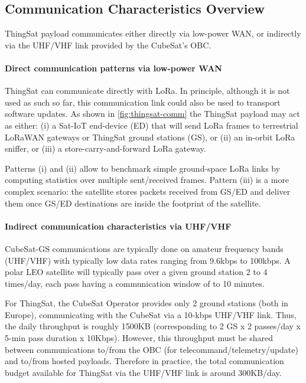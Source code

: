 \subsection{Communication Characteristics Overview}
\label{sec:thingsat-comm-characteristics}

ThingSat payload communicates either directly via low-power WAN, or indirectly
via the UHF/VHF link provided by the CubeSat's OBC.

\paragraph*{Direct communication patterns via low-power WAN}
ThingSat can communicate directly with LoRa. In principle, although it is not used as
such so far, this communication link could also be used to transport software updates.
As shown in \autoref{fig:thingsat-comm} the ThingSat payload may act as either:
(i) a Sat-IoT end-device (ED) that will send LoRa frames to terrestrial LoRaWAN gateways or ThingSat ground stations (GS), or
(ii) an in-orbit LoRa sniffer, or
(iii) a store-carry-and-forward LoRa gateway.

Patterns (i) and (ii) allow to benchmark simple ground-space LoRa links by
computing statistics over multiple sent/received frames.
Pattern (iii) is a more
complex scenario: the satellite stores packets received from GS/ED and deliver
them once GS/ED destinations are inside the footprint of the satellite.

\paragraph*{Indirect communication characteristics via UHF/VHF}
CubeSat-GS communications are typically done on amateur frequency
bands (UHF/VHF) with typically low data rates ranging from 9.6kbps to
100kbps.
A polar LEO satellite will typically pass over a given ground station 2 to 4 times/day,
each pass having a communication window of to 10 minutes.

For ThingSat, the CubeSat Operator provides only 2 ground stations (both in Europe), communicating with
the CubeSat via a 10-kbps UHF/VHF link. Thus, the daily throughput is roughly
1500KB (corresponding to 2 GS x 2 passes/day x 5-min pass duration x 10Kbps).
However, this throughput must be shared between communications to/from the OBC
(for telecommand/telemetry/update) and to/from hosted payloads. Therefore in practice,
the total communication budget available for ThingSat via the UHF/VHF link is around
300KB/day.

